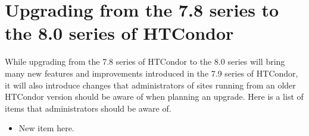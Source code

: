 \section{\label{sec:to-8.0}Upgrading from the 7.8 series to the 8.0 series of HTCondor}

While upgrading from the 7.8 series of HTCondor to the 8.0 series 
will bring many
new features and improvements introduced in the 7.9 series of HTCondor,
it will
also introduce changes that administrators of sites running from an older
HTCondor version should be aware of when planning an upgrade.  
Here is a list of items that administrators should be aware of.

\begin{itemize}

\item New item here.

\end{itemize}

